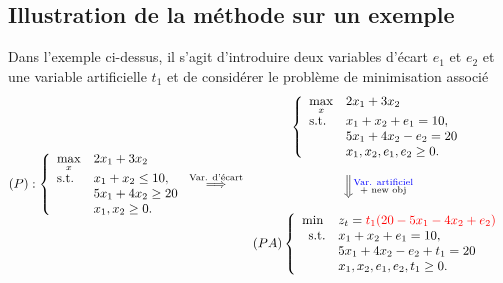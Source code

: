 \documentclass[a4paper,12pt,openany]{book}
\theoremstyle{plain}
\theoremstyle{definition}
\theoremstyle{remark}
\theoremstyle{nbstyle}
\begin{document}
	\subsection{Illustration de la méthode sur un exemple}
	Dans l'exemple ci-dessus, il s'agit d'introduire deux variables d'écart $e_{1}$ et $e_{2}$ et une variable artificielle $t_{1}$ et de considérer le problème de minimisation associé
	\[(P): \left\{
	\begin{array}{ll}
	\underset{x}{\displaystyle\max} & 2x_1 + 3x_2 \\
	\text{s.t.} & x_1 + x_2 \leq 10, \\
	& 5x_1 + 4x_2 \geq 20 \\
	& x_1, x_2 \geq 0.
	\end{array}
	\right.
	\overset{\text{Var. d'écart}}{\Longrightarrow}
	\begin{array}{c}
	\left\{
	\begin{array}{ll}
	\underset{x}{\displaystyle\max} & 2x_1 + 3x_2 \\
	\text{s.t.} & x_1 + x_2 + e_1 = 10, \\
	& 5x_1 + 4x_2 - e_2 = 20 \\
	& x_1, x_2, e_1, e_2 \geq 0.
	\end{array}
	\right.
	\\
	\\
	\Big\Downarrow \substack{\textcolor{blue}{\text{Var. artificiel}} \\ \text{+ new obj}}
	\\
	\\
	(PA)\left\{
	\begin{array}{l}
	\displaystyle\min \quad z_t = \textcolor{red}{t_1(20-5x_1-4x_2+e_2)} \\
	\begin{array}{ll}
	\text{s.t.} & x_1 + x_2 + e_1 = 10, \\
	& 5x_1 + 4x_2 - e_2 + t_1 = 20 \\
	& x_1, x_2, e_1, e_2, t_1 \geq 0.
	\end{array}
	\end{array}
	\right.
	\end{array}\]
	
\end{document}
